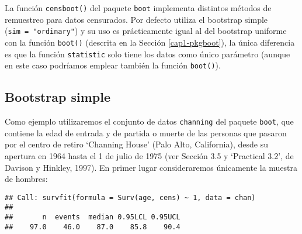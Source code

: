 \documentclass[
]{book}
\newenvironment{Shaded}{\begin{snugshade}}{\end{snugshade}}
\newcommand{\CommentTok}[1]{\textcolor[rgb]{0.56,0.35,0.01}{\textit{#1}}}
\newcommand{\DataTypeTok}[1]{\textcolor[rgb]{0.13,0.29,0.53}{#1}}
\newcommand{\DecValTok}[1]{\textcolor[rgb]{0.00,0.00,0.81}{#1}}
\newcommand{\KeywordTok}[1]{\textcolor[rgb]{0.13,0.29,0.53}{\textbf{#1}}}
\newcommand{\NormalTok}[1]{#1}
\newcommand{\OperatorTok}[1]{\textcolor[rgb]{0.81,0.36,0.00}{\textbf{#1}}}
\newcommand{\StringTok}[1]{\textcolor[rgb]{0.31,0.60,0.02}{#1}}
\theoremstyle{definition}
\theoremstyle{definition}
\theoremstyle{definition}
\theoremstyle{remark}
\begin{document}
La función \texttt{censboot()} del paquete \texttt{boot} implementa distintos métodos
de remuestreo para datos censurados. Por defecto utiliza el bootstrap simple
(\texttt{sim\ =\ "ordinary"}) y su uso es prácticamente igual al del bootstrap uniforme
con la función \texttt{boot()} (descrita en la Sección \ref{cap1-pkgboot}),
la única diferencia es que la función \texttt{statistic} solo tiene los datos
como único parámetro (aunque en este caso podríamos emplear también
la función \texttt{boot()}).

\hypertarget{bootstrap-simple}{%
\subsection{Bootstrap simple}\label{bootstrap-simple}}

Como ejemplo utilizaremos el conjunto de datos \texttt{channing} del paquete \texttt{boot},
que contiene la edad de entrada y de partida o muerte de las personas
que pasaron por el centro de retiro `Channing House' (Palo Alto, California),
desde su apertura en 1964 hasta el 1 de julio de 1975
(ver Sección 3.5 y `Practical 3.2', de Davison y Hinkley, 1997).
En primer lugar consideraremos únicamente la muestra de hombres:

\begin{Shaded}
\end{Shaded}

\begin{verbatim}
## Call: survfit(formula = Surv(age, cens) ~ 1, data = chan)
## 
##       n  events  median 0.95LCL 0.95UCL 
##    97.0    46.0    87.0    85.8    90.4
\end{verbatim}
\end{document}

